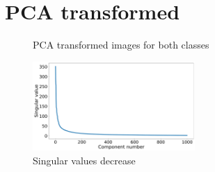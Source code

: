 \documentclass[10pt,a4paper]{article}
\begin{document}
\FloatBarrier
\section{PCA transformed}

\begin{figure}[!htb]
  \centering
  \hfill
  \caption{PCA transformed images for both classes}\label{pca_reduced}
\end{figure}


\begin{figure}[!htb]
  \centering
  \includegraphics[width=0.55\textwidth]{Graphs/pca_decrease.pdf}
  \caption{Singular values decrease}\label{pca_decrease}
\end{figure}
\end{document}
